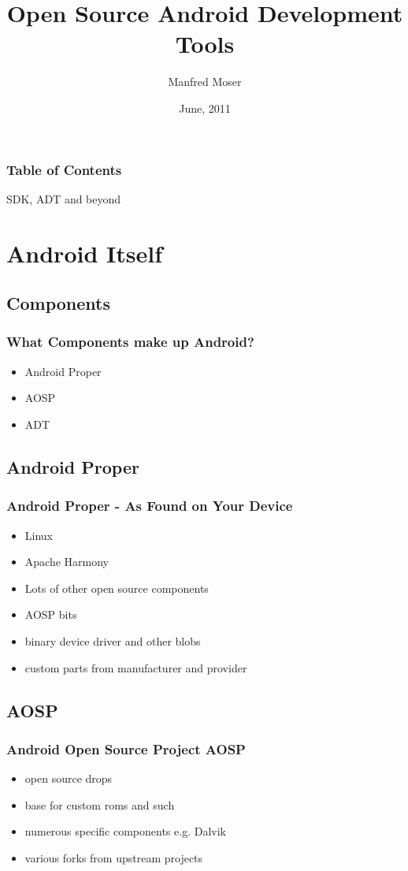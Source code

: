 \documentclass{beamer}
\title{Open Source Android Development Tools}
\author{Manfred Moser}
\date{June, 2011}
\institute[2011]{simpligility technologies inc.}
\begin{document}
\begin{frame}
  \titlepage 
\end{frame}

\begin{frame}
  \frametitle{Table of Contents}
  SDK, ADT and beyond
  \setcounter{tocdepth}{1}
  \tableofcontents
\end{frame}


\section{Android Itself}

  \subsection{Components}
    \begin{frame}
      \frametitle{What Components make up Android?}
      \begin{itemize}
        \item<1->Android Proper
        \item<2->AOSP
        \item<3->ADT
      \end{itemize}
    \end{frame}

  \subsection{Android Proper}
    \begin{frame}
    \frametitle{Android Proper - As Found on Your Device}
    \begin{itemize}
      \item<1->Linux
      \item<2-> Apache Harmony 
      \item<3->Lots of other open source components
      \item<4->AOSP bits
      \item<5->binary device driver and other blobs 
      \item<6-> custom parts from manufacturer and provider
    \end{itemize}
    \end{frame}
  
  \subsection{AOSP}
    \begin{frame}
      \frametitle{Android Open Source Project AOSP}
      \begin{itemize}
        \item<1->open source drops
        \item<2->base for custom roms and such
        \item<3-> numerous specific components e.g. Dalvik
        \item<4->various forks from upstream projects
      \end{itemize}
    \end{frame}
\end{document}
